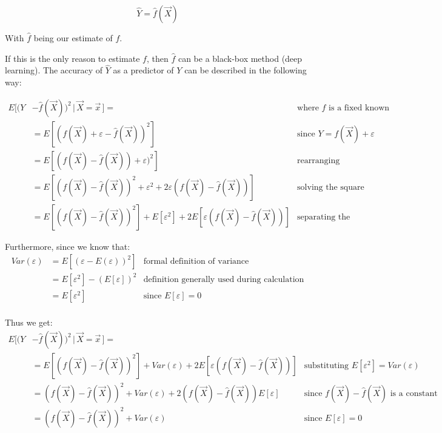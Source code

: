       $$\hat{Y} = \hat{f} (\vec{X})$$

      With $\hat{f}$ being our estimate of $f$.
      
      If this is the only reason to estimate $f$, then $\hat{f}$ can be a black-box method (deep learning).
      The accuracy of $\hat{Y}$ as a predictor of $Y$ can be described in the following way:

      \begin{align*}
        E[(Y&-\hat{f}(\vec{X}))^2 \,|\, \vec{X} = \vec{x}\,] = 
        & \text{where } \hat{f} \text{ is a fixed known function}\\
        & = E[(f(\vec{X}) + \varepsilon - \hat{f}(\vec{X}))^2]
        & \text{since } Y = f(\vec{X}) + \varepsilon \\
        & = E[(f(\vec{X}) - \hat{f}(\vec{X})) + \varepsilon)^2]
        & \text{rearranging} \\
        & = E[(f(\vec{X}) - \hat{f}(\vec{X}))^2 + \varepsilon^2 + 2\varepsilon(f(\vec{X}) - \hat{f}(\vec{X}))]
        & \text{solving the square} \\
        & = E[(f(\vec{X}) - \hat{f}(\vec{X}))^2] + E[\varepsilon^2] + 2E[\varepsilon(f(\vec{X}) - \hat{f}(\vec{X}))]
        & \text{separating the expectations}
      \end{align*}
      
      Furthermore, since we know that:
      \begin{align*}
        Var(\varepsilon) 
        & = E[(\varepsilon - E(\varepsilon))^2]
        & \text{formal definition of variance} \\
        & = E[\varepsilon^2] - (E[\varepsilon])^2  
        & \text{definition generally used during calculation} \\
        & = E[\varepsilon^2] 
        & \text{since } E[\varepsilon] = 0 \\
      \end{align*}

      Thus we get:
      \begin{align*}
        E[(Y&-\hat{f}(\vec{X}))^2 \,|\, \vec{X} = \vec{x}\,] = \\
        & = E[(f(\vec{X}) - \hat{f}(\vec{X}))^2] + Var(\varepsilon) + 2E[\varepsilon(f(\vec{X}) - \hat{f}(\vec{X}))]
        & \text{substituting } E[\varepsilon^2] = Var(\varepsilon) \\
        & = (f(\vec{X}) - \hat{f}(\vec{X}))^2 + Var(\varepsilon) + 2(f(\vec{X}) - \hat{f}(\vec{X}))E[\varepsilon]
        & \text{since } f(\vec{X}) - \hat{f}(\vec{X}) \text{ is a constant}\\
        & = (f(\vec{X}) - \hat{f}(\vec{X}))^2 + Var(\varepsilon)
        & \text{since } E[\varepsilon] = 0 \\
      \end{align*}

